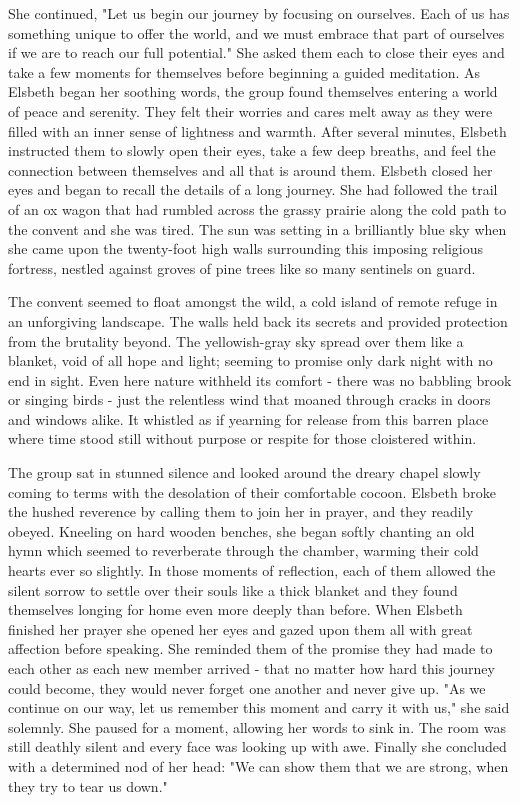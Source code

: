\documentclass[11pt]{article}
\begin{document}
She continued, "Let us begin our journey by focusing on ourselves. Each of us has something unique to offer the world, and we must embrace that part of ourselves if we are to reach our full potential." She asked them each to close their eyes and take a few moments for themselves before beginning a guided meditation.
As Elsbeth began her soothing words, the group found themselves entering a world of peace and serenity. They felt their worries and cares melt away as they were filled with an inner sense of lightness and warmth. After several minutes, Elsbeth instructed them to slowly open their eyes, take a few deep breaths, and feel the connection between themselves and all that is around them.
Elsbeth closed her eyes and began to recall the details of a long journey. She had followed the trail of an ox wagon that had rumbled across the grassy prairie along the cold path to the convent and she was tired. The sun was setting in a brilliantly blue sky when she came upon the twenty-foot high walls surrounding this imposing religious fortress, nestled against groves of pine trees like so many sentinels on guard.

The convent seemed to float amongst the wild, a cold island of remote refuge in an unforgiving landscape. The walls held back its secrets and provided protection from the brutality beyond. The yellowish-gray sky spread over them like a blanket, void of all hope and light; seeming to promise only dark night with no end in sight. Even here nature withheld its comfort - there was no babbling brook or singing birds - just the relentless wind that moaned through cracks in doors and windows alike. It whistled as if yearning for release from this barren place where time stood still without purpose or respite for those cloistered within.

The group sat in stunned silence and looked around the dreary chapel slowly coming to terms with the desolation of their comfortable cocoon. Elsbeth broke the hushed reverence by calling them to join her in prayer, and they readily obeyed. Kneeling on hard wooden benches, she began softly chanting an old hymn which seemed to reverberate through the chamber, warming their cold hearts ever so slightly. In those moments of reflection, each of them allowed the silent sorrow to settle over their souls like a thick blanket and they found themselves longing for home even more deeply than before.
When Elsbeth finished her prayer she opened her eyes and gazed upon them all with great affection before speaking. She reminded them of the promise they had made to each other as each new member arrived - that no matter how hard this journey could become, they would never forget one another and never give up.
"As we continue on our way, let us remember this moment and carry it with us," she said solemnly. She paused for a moment, allowing her words to sink in. The room was still deathly silent and every face was looking up with awe. Finally she concluded with a determined nod of her head: "We can show them that we are strong, when they try to tear us down."
\end{document}
